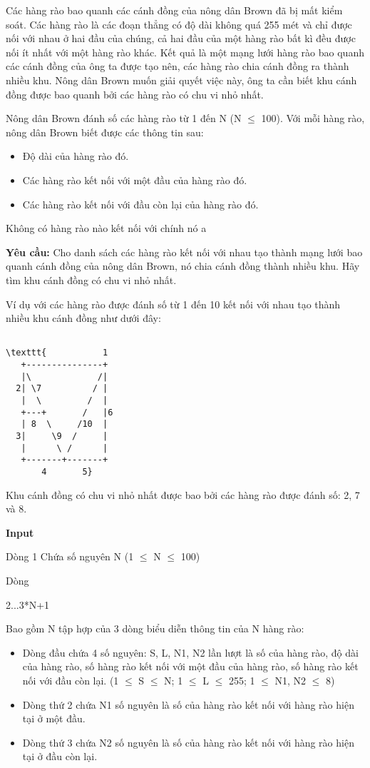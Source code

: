 

Các hàng rào bao quanh các cánh đồng của nông dân Brown đã bị mất kiểm soát. Các hàng rào là các đoạn thẳng có độ dài không quá 255 mét và chỉ được nối với nhau ở hai đầu của chúng, cả hai đầu của một hàng rào bất kì đều được nối ít nhất với một hàng rào khác. Kết quả là một mạng lưới hàng rào bao quanh các cánh đồng của ông ta được tạo nên, các hàng rào chia cánh đồng ra thành nhiều khu. Nông dân Brown muốn giải quyết việc này, ông ta cần biết khu cánh đồng được bao quanh bởi các hàng rào có chu vi nhỏ nhất.

Nông dân Brown đánh số các hàng rào từ 1 đến N (N $\le$ 100). Với mỗi hàng rào, nông dân Brown biết được các thông tin sau:
\begin{itemize}
	\item Độ dài của hàng rào đó.
	\item Các hàng rào kết nối với một đầu của hàng rào đó.
	\item Các hàng rào kết nối với đầu còn lại của hàng rào đó.
\end{itemize}

Không có hàng rào nào kết nối với chính nó ^^!

\textbf{Yêu cầu: } Cho danh sách các hàng rào kết nối với nhau tạo thành mạng lưới bao quanh cánh đồng của nông dân Brown, nó chia cánh đồng thành nhiều khu. Hãy tìm khu cánh đồng có chu vi nhỏ nhất.

Ví dụ với các hàng rào được đánh số từ 1 đến 10 kết nối với nhau tạo thành nhiều khu cánh đồng như dưới đây:
\begin{verbatim}

\texttt{           1
   +---------------+
   |\             /|
  2| \7          / |
   |  \         /  |
   +---+       /   |6
   | 8  \     /10  |
  3|     \9  /     |
   |      \ /      |
   +-------+-------+
       4       5}\end{verbatim}

Khu cánh đồng có chu vi nhỏ nhất được bao bởi các hàng rào được đánh số: 2, 7 và 8.   

\textbf{Input }

Dòng 1 Chứa số nguyên N (1  $\le$  N  $\le$  100)

Dòng

2...3*N+1

Bao gồm N tập hợp của 3 dòng biểu diễn thông tin của N hàng rào:
\begin{itemize}
	\item Dòng đầu chứa 4 số nguyên: S, L, N1, N2 lần lượt là số của hàng rào, độ dài của hàng rào, số hàng rào kết nối với một đầu của hàng rào, số hàng rào kết nối với đầu còn lại. (1 $\le$ S $\le$ N; 1 $\le$ L $\le$ 255; 1 $\le$ N1, N2 $\le$ 8)
\end{itemize}
\begin{itemize}
	\item Dòng thứ 2 chứa N1 số nguyên là số của hàng rào kết nối với hàng rào hiện tại ở một đầu.
\end{itemize}
\begin{itemize}
	\item Dòng thứ 3 chứa N2 số nguyên là số của hàng rào kết nối với hàng rào hiện tại ở đầu còn lại.
\end{itemize}

